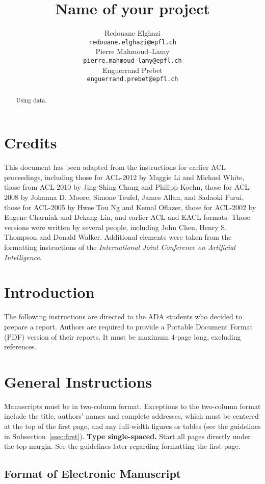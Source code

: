 \documentclass[11pt]{article}
\title{Name of your project}
\author{Redouane Elghazi \\
  {\tt redouane.elghazi@epfl.ch} \\\And
  Pierre Mahmoud--Lamy \\
  {\tt pierre.mahmoud-lamy@epfl.ch} \\\And
Enguerrand Prebet \\
{\tt enguerrand.prebet@epfl.ch} \\}
\date{}
\begin{document}
\maketitle
\begin{abstract}
	Using  data.
\end{abstract}

\section{Credits}

This document has been adapted from the instructions for earlier ACL
proceedings, including those for ACL-2012 by Maggie Li and Michael
White, those from ACL-2010 by Jing-Shing Chang and Philipp Koehn,
those for ACL-2008 by Johanna D. Moore, Simone Teufel, James Allan,
and Sadaoki Furui, those for ACL-2005 by Hwee Tou Ng and Kemal
Oflazer, those for ACL-2002 by Eugene Charniak and Dekang Lin, and
earlier ACL and EACL formats. Those versions were written by several
people, including John Chen, Henry S. Thompson and Donald
Walker. Additional elements were taken from the formatting
instructions of the {\em International Joint Conference on Artificial
  Intelligence}.

\section{Introduction}

The following instructions are directed to the ADA students who decided to prepare a report. Authors are
required to provide a Portable Document Format (PDF) version of their
reports. It must be maximum 4-page long, excluding references.

\section{General Instructions}

Manuscripts must be in two-column format.  Exceptions to the
two-column format include the title, authors' names and complete
addresses, which must be centered at the top of the first page, and
any full-width figures or tables (see the guidelines in
Subsection~\ref{ssec:first}). {\bf Type single-spaced.}  Start all
pages directly under the top margin. See the guidelines later
regarding formatting the first page.

\subsection{Format of Electronic Manuscript}
\label{sect:pdf}
\end{document}
